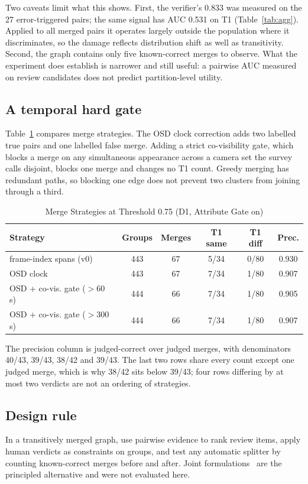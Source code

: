 \documentclass[journal]{IEEEtran}
\begin{document}
Two caveats limit what this shows. First, the verifier's 0.833 was measured on the 27 error-triggered pairs; the same signal has AUC 0.531 on T1 (Table~\ref{tab:agg}). Applied to all merged pairs it operates largely outside the population where it discriminates, so the damage reflects distribution shift as well as transitivity. Second, the graph contains only five known-correct merges to observe. What the experiment does establish is narrower and still useful: a pairwise AUC measured on review candidates does not predict partition-level utility.

\subsection{A temporal hard gate}
Table~\ref{tab:merge} compares merge strategies. The OSD clock correction adds two labelled true pairs and one labelled false merge. Adding a strict co-visibility gate, which blocks a merge on any simultaneous appearance across a camera set the survey calls disjoint, blocks one merge and changes no T1 count. Greedy merging has redundant paths, so blocking one edge does not prevent two clusters from joining through a third.

\begin{table}[t]
\caption{Merge Strategies at Threshold 0.75 (D1, Attribute Gate on)}\label{tab:merge}
\centering
\setlength{\tabcolsep}{3.5pt}
\begin{tabular}{@{}lccccc@{}}
\toprule
Strategy & Groups & Merges & T1 same & T1 diff & Prec.\\
\midrule
frame-index spans (v0) & 443 & 67 & 5/34 & 0/80 & 0.930\\
OSD clock & 443 & 67 & 7/34 & 1/80 & 0.907\\
OSD + co-vis. gate ($>$60 s) & 444 & 66 & 7/34 & 1/80 & 0.905\\
OSD + co-vis. gate ($>$300 s) & 444 & 66 & 7/34 & 1/80 & 0.907\\
\bottomrule
\end{tabular}
\end{table}

The precision column is judged-correct over judged merges, with denominators 40/43, 39/43, 38/42 and 39/43. The last two rows share every count except one judged merge, which is why 38/42 sits below 39/43; four rows differing by at most two verdicts are not an ordering of strategies.

\subsection{Design rule}
In a transitively merged graph, use pairwise evidence to rank review items, apply human verdicts as constraints on groups, and test any automatic splitter by counting known-correct merges before and after. Joint formulations~\cite{bansal2004,tang2017} are the principled alternative and were not evaluated here.
\end{document}
